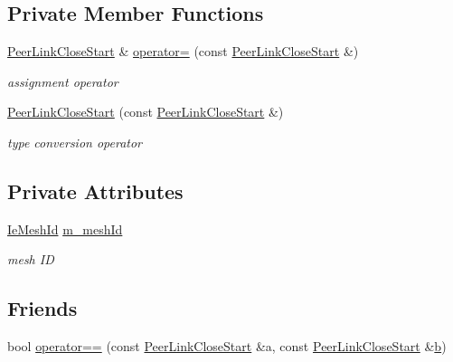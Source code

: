 \subsection*{Private Member Functions}
\begin{DoxyCompactItemize}
\item 
\hyperlink{classns3_1_1dot11s_1_1PeerLinkCloseStart}{Peer\+Link\+Close\+Start} \& \hyperlink{classns3_1_1dot11s_1_1PeerLinkCloseStart_a6febfb36971533f8f4fccb3f89ff5f63}{operator=} (const \hyperlink{classns3_1_1dot11s_1_1PeerLinkCloseStart}{Peer\+Link\+Close\+Start} \&)
\begin{DoxyCompactList}\small\item\em assignment operator \end{DoxyCompactList}\item 
\hyperlink{classns3_1_1dot11s_1_1PeerLinkCloseStart_ada12b4986b1dfa0fcc383947123694b7}{Peer\+Link\+Close\+Start} (const \hyperlink{classns3_1_1dot11s_1_1PeerLinkCloseStart}{Peer\+Link\+Close\+Start} \&)
\begin{DoxyCompactList}\small\item\em type conversion operator \end{DoxyCompactList}\end{DoxyCompactItemize}
\subsection*{Private Attributes}
\begin{DoxyCompactItemize}
\item 
\hyperlink{classns3_1_1dot11s_1_1IeMeshId}{Ie\+Mesh\+Id} \hyperlink{classns3_1_1dot11s_1_1PeerLinkCloseStart_ac417fdd4c8940d78be460da53937ee55}{m\+\_\+mesh\+Id}
\begin{DoxyCompactList}\small\item\em mesh ID \end{DoxyCompactList}\end{DoxyCompactItemize}
\subsection*{Friends}
\begin{DoxyCompactItemize}
\item 
bool \hyperlink{classns3_1_1dot11s_1_1PeerLinkCloseStart_ae9d25dbdb0fd71e237ed973ebf062623}{operator==} (const \hyperlink{classns3_1_1dot11s_1_1PeerLinkCloseStart}{Peer\+Link\+Close\+Start} \&a, const \hyperlink{classns3_1_1dot11s_1_1PeerLinkCloseStart}{Peer\+Link\+Close\+Start} \&\hyperlink{lte__pathloss_8m_a21ad0bd836b90d08f4cf640b4c298e7c}{b})
\end{DoxyCompactItemize}
